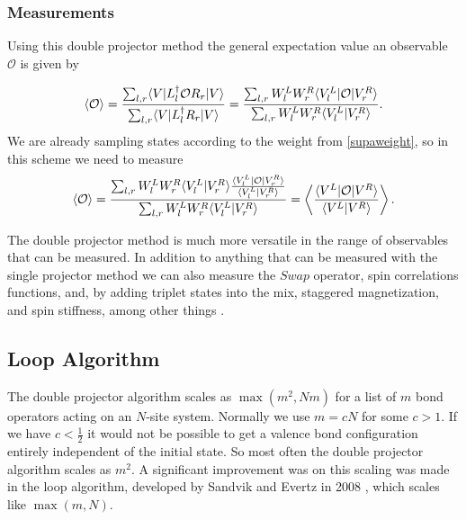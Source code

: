 \subsubsection{Measurements}
Using this double projector method the general expectation value an observable $\mathcal{O}$ is given by

\begin{equation}
\label{generalop1}
\langle \mathcal{O} \rangle = \frac{ \sum_{l,r} \langle {V} \rvert L_l^\dagger \mathcal{O} R_r \lvert {V} \rangle}
							{\sum_{l,r} \langle {V} \rvert L_l^\dagger R_r \lvert {V} \rangle}
		=\frac{ \sum_{l,r} W^L_l W^R_r \langle {V^L_l} \rvert\mathcal{O}  \lvert {V^R_r} \rangle}
							{\sum_{l,r} W^L_l W_r^R \langle {V^L_l} \rvert V^R_r\rangle}.
\end{equation}
We are already sampling states according to the weight from \eqref{supaweight}, so in this scheme we need to measure
\begin{equation}
\label{generalop2}
\langle \mathcal{O} \rangle = 
 \frac{   \sum_{l,r} W^L_l W^R_r  \langle {V^L_l} \rvert V^R_r\rangle    
		\frac{   \langle {V^L_l} \rvert\mathcal{O}  \lvert {V^R_r} \rangle  }{   \langle {V^L_l} \rvert V^R_r\rangle  }}
							{\sum_{l,r} W^L_l W_r^R \langle {V^L_l} \rvert V^R_r\rangle}
	= \left<
		\frac{   \langle {V^L} \rvert\mathcal{O}  \lvert {V^R} \rangle  }{   \langle {V^L} \rvert V^R\rangle  }
						\right>.
\end{equation}

The double projector method is much more versatile in the range of observables that can be measured.  
In addition to anything that can be measured with the single projector method we can also measure the $Swap$ operator, spin correlations functions, and, by adding triplet states into the mix, staggered magnetization, and spin stiffness, among other things \cite{Beach2006}.

\subsection{Loop Algorithm}
\label{sec:loop}

The double projector algorithm scales as $ \max(m^2, Nm)$ for a list of $m$ bond operators acting on an $N$-site system.  
Normally we use $m = cN$ for some $c > 1$.  If we have $c<\frac{1}{2}$ it would not be possible to get a valence bond configuration entirely independent of the initial state.
So most often the double projector algorithm scales as $m^2$.
A significant improvement was on this scaling was made in the loop algorithm, developed by Sandvik and Evertz in 2008 \cite{Sandvik2008, Loops}, which scales like $\max(m,N)$.


